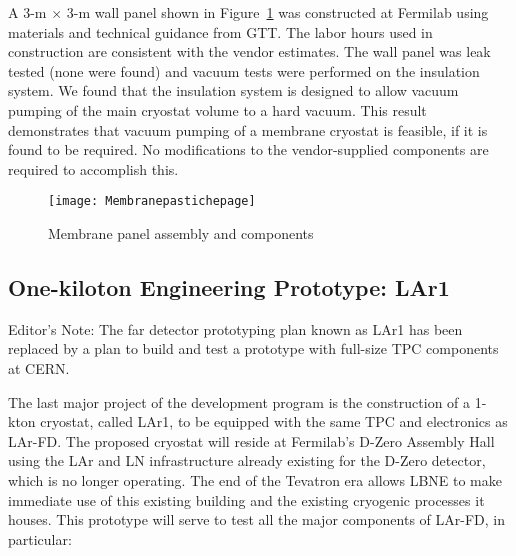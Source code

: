 A 3-m $\times$ 3-m wall panel shown in Figure~\ref{3panel} was constructed at Fermilab using materials and technical guidance from GTT. The labor hours used in construction are consistent with the vendor estimates. The wall panel was leak tested (none were found) and vacuum tests were performed on the insulation system. We found that the insulation system is designed to allow vacuum pumping of the main cryostat volume to a hard vacuum. This result demonstrates that vacuum pumping of a membrane cryostat is feasible, if it is found to be required. No modifications to the vendor-supplied components are required to accomplish this.

\begin{figure}
\centering 
{\texttt{[image: Membranepastichepage]}}
\caption{Membrane panel assembly and components}
\label{3panel}
\end{figure}


\subsection {One-kiloton Engineering Prototype: LAr1}

\begin{editornote}
Editor's Note: The far detector prototyping plan known as LAr1 has been replaced by a plan to build and test a prototype with full-size TPC components at CERN.
\end{editornote}


The last major project of the development program is the construction of a 1-kton cryostat, called LAr1, to be equipped with %
the same TPC and electronics as LAr-FD.  The proposed cryostat will reside at Fermilab's D-Zero Assembly Hall using the LAr and LN infrastructure already existing for the D-Zero detector, which is no longer operating.  The end of the Tevatron era %
allows LBNE to make immediate use of %
this existing building and the existing cryogenic processes it houses. %
 This prototype will serve to %
test all the major components of LAr-FD, in particular:

